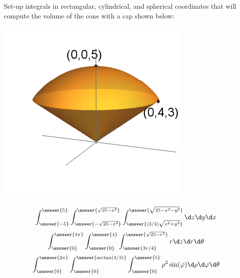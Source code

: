 \documentclass{ximera}
\author{Bart Snapp}
\begin{document}
\begin{exercise}
  Set-up integrals in rectangular, cylindrical, and spherical
  coordinates that will compute the volume of the cone with a cap shown below:
  \begin{image}
    \includegraphics{coneWithCap2.png}
  \end{image}
  \begin{prompt}
  \[
  \int_{\answer{-5}}^{\answer{5}}\int_{\answer{-\sqrt{25-x^2}}}^{\answer{\sqrt{25-x^2}}}\int_{\answer{(3/4)\sqrt{x^2+y^2}}}^{\answer{\sqrt{25-x^2-y^2}}}\d z \d y \d x
  \]
  \[
  \int_{\answer{0}}^{\answer{2\pi}}\int_{\answer{0}}^{\answer{4}}\int_{\answer{3r/4}}^{\answer{\sqrt{25-r^2}}}   r\d z \d r \d \theta
  \]
  \[
  \int_{\answer{0}}^{\answer{2\pi}}\int_{\answer{0}}^{\answer{\arctan(4/3)}}\int_{\answer{0}}^{\answer{5}}   \rho^2\sin(\varphi)\d \rho \d \varphi \d \theta
  \]
  \end{prompt}
\end{exercise}
\end{document}
